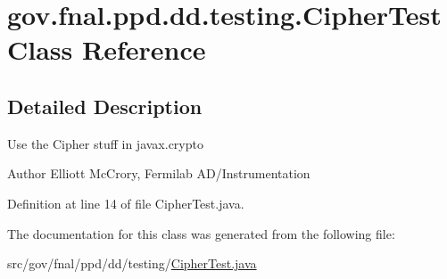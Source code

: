 \hypertarget{classgov_1_1fnal_1_1ppd_1_1dd_1_1testing_1_1CipherTest}{\section{gov.\-fnal.\-ppd.\-dd.\-testing.\-Cipher\-Test Class Reference}
\label{classgov_1_1fnal_1_1ppd_1_1dd_1_1testing_1_1CipherTest}
}


\subsection{Detailed Description}
Use the Cipher stuff in javax.\-crypto

\begin{DoxyAuthor}{Author}
Elliott Mc\-Crory, Fermilab A\-D/\-Instrumentation 
\end{DoxyAuthor}


Definition at line 14 of file Cipher\-Test.\-java.



The documentation for this class was generated from the following file\-:\begin{DoxyCompactItemize}
\item 
src/gov/fnal/ppd/dd/testing/\hyperlink{CipherTest_8java}{Cipher\-Test.\-java}\end{DoxyCompactItemize}
